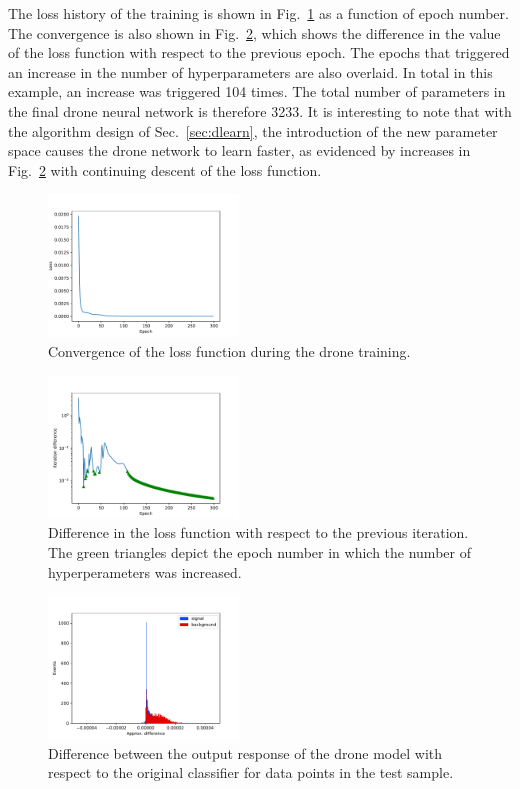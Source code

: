 \documentclass[final,5p,times,twocolumn]{elsarticle}
\begin{document}
The loss history of the training is shown in Fig.~\ref{fig:loss}
as a function of epoch number.
The convergence is also shown in Fig.~\ref{fig:iterdiff}, which shows
the difference in the value of the loss function with respect to the previous
epoch. The epochs that triggered an increase in the number of hyperparameters
are also overlaid.
In total in this example, an increase was triggered 104 times. The total number
of parameters in the final drone neural network is therefore 3233. It is interesting
to note that with the algorithm design of Sec.~\ref{sec:dlearn}, the introduction
of the new parameter space causes the drone network to learn faster, as evidenced by
increases in Fig.~\ref{fig:iterdiff} with continuing descent of the loss function.
\begin{figure}[t]
\centering
\includegraphics[width=0.45\textwidth]{loss_history.pdf}
\caption{\small 
Convergence of the loss function during the drone training.
}
\label{fig:loss}
\end{figure}
\begin{figure}[t]
\centering
\includegraphics[width=0.45\textwidth]{diff_history.pdf}
\caption{\small 
Difference in the loss function with respect to the previous iteration. The green triangles
depict the epoch number in which the number of hyperperameters was increased.
}
\label{fig:iterdiff}
\end{figure}
\begin{figure}[t]
\centering
\includegraphics[width=0.45\textwidth]{approx_vs_truth_diff.pdf}
\caption{\small 
Difference between the output response of the drone model with respect to
the original classifier for data points in the test sample.
}
\label{fig:diff}
\end{figure}
\end{document}
